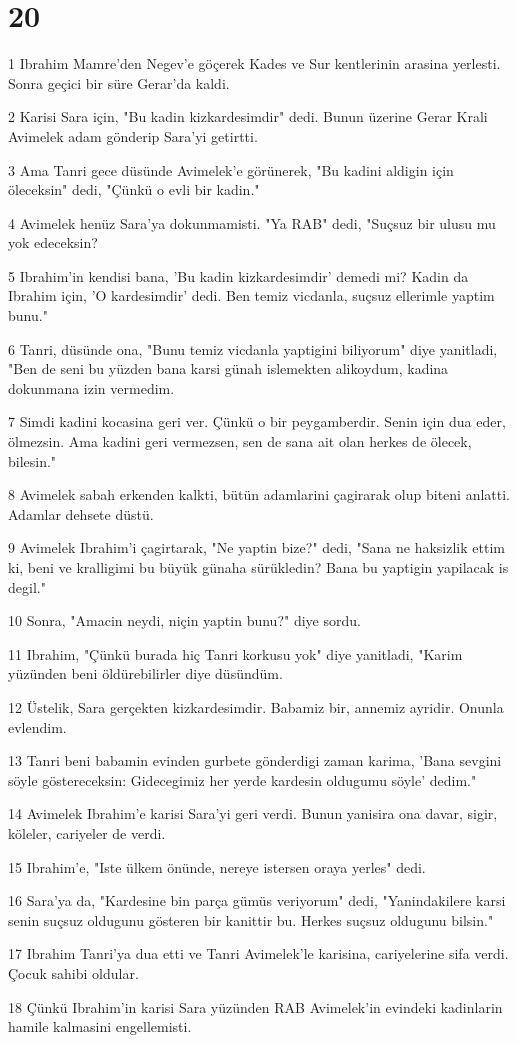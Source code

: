 \chapter{20}

\par 1 Ibrahim Mamre'den Negev'e göçerek Kades ve Sur kentlerinin arasina yerlesti. Sonra geçici bir süre Gerar'da kaldi.
\par 2 Karisi Sara için, "Bu kadin kizkardesimdir" dedi. Bunun üzerine Gerar Krali Avimelek adam gönderip Sara'yi getirtti.
\par 3 Ama Tanri gece düsünde Avimelek'e görünerek, "Bu kadini aldigin için öleceksin" dedi, "Çünkü o evli bir kadin."
\par 4 Avimelek henüz Sara'ya dokunmamisti. "Ya RAB" dedi, "Suçsuz bir ulusu mu yok edeceksin?
\par 5 Ibrahim'in kendisi bana, 'Bu kadin kizkardesimdir' demedi mi? Kadin da Ibrahim için, 'O kardesimdir' dedi. Ben temiz vicdanla, suçsuz ellerimle yaptim bunu."
\par 6 Tanri, düsünde ona, "Bunu temiz vicdanla yaptigini biliyorum" diye yanitladi, "Ben de seni bu yüzden bana karsi günah islemekten alikoydum, kadina dokunmana izin vermedim.
\par 7 Simdi kadini kocasina geri ver. Çünkü o bir peygamberdir. Senin için dua eder, ölmezsin. Ama kadini geri vermezsen, sen de sana ait olan herkes de ölecek, bilesin."
\par 8 Avimelek sabah erkenden kalkti, bütün adamlarini çagirarak olup biteni anlatti. Adamlar dehsete düstü.
\par 9 Avimelek Ibrahim'i çagirtarak, "Ne yaptin bize?" dedi, "Sana ne haksizlik ettim ki, beni ve kralligimi bu büyük günaha sürükledin? Bana bu yaptigin yapilacak is degil."
\par 10 Sonra, "Amacin neydi, niçin yaptin bunu?" diye sordu.
\par 11 Ibrahim, "Çünkü burada hiç Tanri korkusu yok" diye yanitladi, "Karim yüzünden beni öldürebilirler diye düsündüm.
\par 12 Üstelik, Sara gerçekten kizkardesimdir. Babamiz bir, annemiz ayridir. Onunla evlendim.
\par 13 Tanri beni babamin evinden gurbete gönderdigi zaman karima, 'Bana sevgini söyle göstereceksin: Gidecegimiz her yerde kardesin oldugumu söyle' dedim."
\par 14 Avimelek Ibrahim'e karisi Sara'yi geri verdi. Bunun yanisira ona davar, sigir, köleler, cariyeler de verdi.
\par 15 Ibrahim'e, "Iste ülkem önünde, nereye istersen oraya yerles" dedi.
\par 16 Sara'ya da, "Kardesine bin parça gümüs veriyorum" dedi, "Yanindakilere karsi senin suçsuz oldugunu gösteren bir kanittir bu. Herkes suçsuz oldugunu bilsin."
\par 17 Ibrahim Tanri'ya dua etti ve Tanri Avimelek'le karisina, cariyelerine sifa verdi. Çocuk sahibi oldular.
\par 18 Çünkü Ibrahim'in karisi Sara yüzünden RAB Avimelek'in evindeki kadinlarin hamile kalmasini engellemisti.

